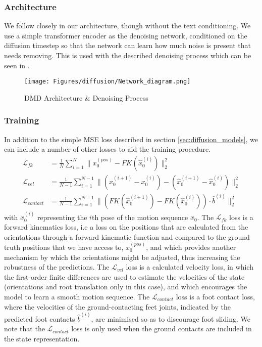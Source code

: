 \subsubsection{Architecture}
We follow closely \cite{MDM} in our architecture, though without the text conditioning. We use a simple transformer \cite{vaswani2017attention} encoder as the denoising network, conditioned on the diffusion timestep so that the network can learn how much noise is present that needs removing. This is used with the described denoising process which can be seen in .

\begin{figure}[!ht]
    \centering
    \texttt{[image: Figures/diffusion/Network\_diagram.png]}
    \caption{DMD Architecture \& Denoising Process}
    \label{fig:dmd_architecture}
\end{figure}



\subsubsection{Training}
\label{sec:diffusion_training}

In addition to the simple MSE loss described in section \ref{sec:diffusion_models}, we can include a number of other losses to aid the training procedure.
\begin{equation}
    \begin{aligned}
        \mathcal{L}_{fk} &= \frac{1}{N} \sum_{i=1}^{N} \| x_0^{(pos)} - FK(\hat{x}_0^{(i)})  \|_2^2 \\
        \mathcal{L}_{vel} &= \frac{1}{N-1} \sum_{i=1}^{N-1} \| (x_0^{(i+1)} - x_0^{(i)}) - (\hat{x}_0^{(i+1)} - \hat{x}_0^{(i)}) \|_2^2 \\
        \mathcal{L}_{contact} &= \frac{1}{N-1} \sum_{i=1}^{N-1} \| \left( FK(\hat{x}_0^{(i+1)}) - FK(\hat{x}_0^{(i)}) \right) \cdot \hat{b}^{(i)}  \|_2^2
    \end{aligned}
\end{equation}
with $x_0^{(i)}$ representing the $i$th pose of the motion sequence $x_0$. The $\mathcal{L}_{fk}$ loss is a forward kinematics loss, i.e a loss on the positions that are calculated from the orientations through a forward kinematic function and compared to the ground truth positions that we have access to, $x_0^{(pos)}$, and which provides another mechanism by which the orientations might be adjusted, thus increasing the robustness of the predictions. The $\mathcal{L}_{vel}$ loss is a calculated velocity loss, in which the first-order finite differences are used to estimate the velocities of the state (orientations and root translation only in this case), and which encourages the model to learn a smooth motion sequence. The $\mathcal{L}_{contact}$ loss is a foot contact loss, where the velocities of the ground-contacting feet joints, indicated by the predicted foot contacts $\hat{b}^{(i)}$, are minimised so as to discourage foot sliding. We note that the $\mathcal{L}_{contact}$ loss is only used when the ground contacts are included in the state representation.



